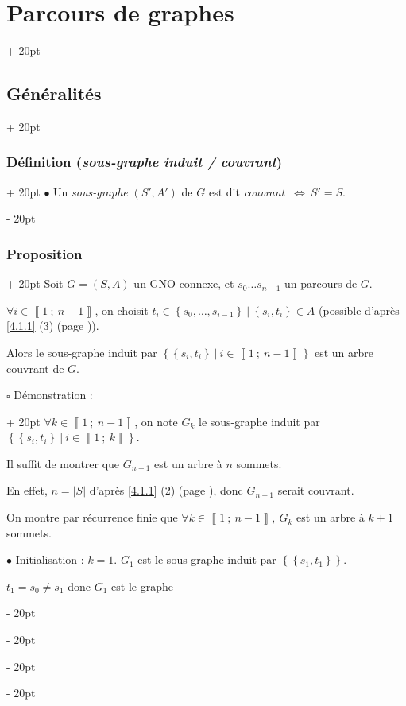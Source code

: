 \documentclass[a4paper, 12pt, twoside]{article}
\newcommand{\nset}[2]{\left\llbracket #1\ ;\ #2 \right\rrbracket}
\newcommand{\set}[1]{\left\{ #1 \right\}}
\newcommand{\abs}[1]{\left\lvert #1 \right\rvert}
\newcommand{\ssi}{\ \Leftrightarrow \ }
\newcommand{\ind}[1][20pt]{\advance\leftskip + #1}
\newcommand{\deind}[1][20pt]{\advance\leftskip - #1}
\newenvironment{indt}[2][20pt]{#2 \par \ind[#1]}{\par \deind} %
\begin{document}
\begin{indt}{\section{Parcours de graphes}}
\begin{indt}{\subsection{Généralités}}
\begin{indt}{\subsubsection{Définition (\textit{sous-graphe induit / couvrant})}}
                $\bullet$ Un \textit{sous-graphe} $(S', A')$ de $G$ est dit \textit{couvrant} $\ssi S' = S$.
            \end{indt}

            \vspace{12pt}
            
            \begin{indt}{\subsubsection{Proposition}}
                Soit $G = (S, A)$ un GNO connexe, et $s_0 \ldots s_{n - 1}$ un parcours de $G$.

                $\forall i \in \nset 1 {n - 1}$, on choisit $t_i \in \set{s_0, \ldots, s_{i - 1}}\ |\ \set{s_i, t_i} \in A$ (possible d'après \ref{4.1.1} (3) (page \pageref{4.1.1})).

                \vspace{6pt}
                
                Alors le sous-graphe induit par $\set{\set{s_i, t_i}\ |\ i \in \nset 1 {n - 1}}$ est un arbre couvrant de $G$.

                \vspace{6pt}
                
                \begin{indt}{$\square$ Démonstration :}
                    $\forall k \in \nset 1 {n - 1}$, on note $G_k$ le sous-graphe induit par $\set{\set{s_i, t_i}\ |\ i \in \nset 1 {k}}$.

                    Il suffit de montrer que $G_{n - 1}$ est un arbre à $n$ sommets.

                    En effet, $n = \abs S$ d'après \ref{4.1.1} (2) (page \pageref{4.1.1}), donc $G_{n - 1}$ serait couvrant.

                    On montre par récurrence finie que $\forall k \in \nset 1 {n - 1},\ G_k$ est un arbre à $k + 1$ sommets.

                    \vspace{6pt}
                    
                    $\bullet$ Initialisation : $k = 1$. $G_1$ est le sous-graphe induit par $\set{\set{s_1, t_1}}$.

                    $t_1 = s_0 \neq s_1$ donc $G_1$ est le graphe 
                    \begin{center}
\end{center}
\end{indt}
\end{indt}
\end{indt}
\end{indt}
\end{document}
